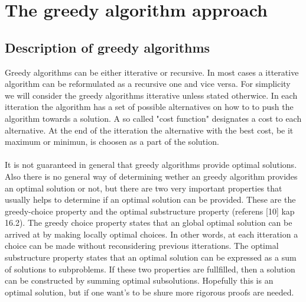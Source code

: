 \section{The greedy algorithm approach}
\subsection{Description of greedy algorithms}
Greedy algorithms can be either itterative or recursive. In most cases a itterative algorithm can be reformulated as a recursive one and vice versa. For simplicity we will consider the greedy algorithms itterative unless stated otherwice. In each itteration the algorithm has a set of possible alternatives on how to to push the algorithm towards a solution. A so called "cost function" designates a cost to each alternative. At the end of the itteration the alternative with the best cost, be it maximum or minimun, is choosen as a part of the solution. \\
\\It is not guaranteed in general that greedy algorithms provide optimal solutions. Also there is no general way of determining wether an greedy algorithm provides an optimal solution or not, but there are two very important properties that usually helps to determine if an optimal solution can be provided. These are the greedy-choice property and the optimal substructure property (referens [10] kap 16.2). The greedy choice property states that an global optimal solution can be arrived at by making locally optimal choices. In other words, at each itteration a choice can be made without reconsidering previous itterations. The optimal substructure property states that an optimal solution can be expressed as a sum of solutions to subproblems. If these two properties are fullfilled, then a solution can be constructed by summing optimal subsolutions. Hopefully this is an optimal solution, but if one want's to be shure more rigorous proofs are needed. 


